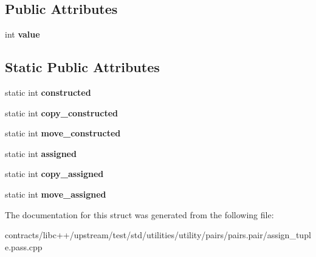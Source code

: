 \subsection*{Public Attributes}
\begin{DoxyCompactItemize}
\item 
\mbox{\label{struct_counting_type_a0f260f291ff30294080edb0f436a3373}} 
int {\bfseries value}
\end{DoxyCompactItemize}
\subsection*{Static Public Attributes}
\begin{DoxyCompactItemize}
\item 
\mbox{\label{struct_counting_type_aa019fe629bf26c7118d129386fa98818}} 
static int {\bfseries constructed}
\item 
\mbox{\label{struct_counting_type_aa1d9f0d8517115cfb26580eaf75b2f54}} 
static int {\bfseries copy\+\_\+constructed}
\item 
\mbox{\label{struct_counting_type_aaee12c038f0558eab9aa362f58303edf}} 
static int {\bfseries move\+\_\+constructed}
\item 
\mbox{\label{struct_counting_type_a13d332176fe441c35defea159d6551da}} 
static int {\bfseries assigned}
\item 
\mbox{\label{struct_counting_type_a48a5e36f4e5ca5c14bb4ff71a2222931}} 
static int {\bfseries copy\+\_\+assigned}
\item 
\mbox{\label{struct_counting_type_a4597293fb61b7684a855832e249295c7}} 
static int {\bfseries move\+\_\+assigned}
\end{DoxyCompactItemize}


The documentation for this struct was generated from the following file\+:\begin{DoxyCompactItemize}
\item 
contracts/libc++/upstream/test/std/utilities/utility/pairs/pairs.\+pair/assign\+\_\+tuple.\+pass.\+cpp\end{DoxyCompactItemize}
